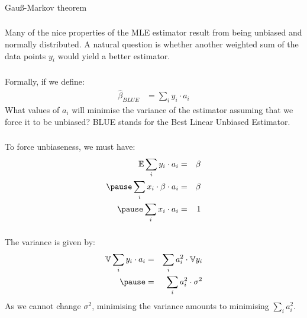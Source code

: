 \begin{frame}[fragile] \frametitle{}

\begin{flushright}
{\color{yaleblue}\sc\fontsize{1cm}{0cm}\selectfont Gauß-Markov theorem}
\end{flushright}

\end{frame}

\begin{frame}[fragile] \frametitle{}

Many of the nice properties of the MLE estimator result from being
unbiased and normally distributed. A natural question is whether
another weighted sum of the data points $y_i$ would yield a better
estimator.

\end{frame}

\begin{frame}[fragile] \frametitle{}

Formally, if we define:
\begin{align*}
\widehat{\beta}_{BLUE} &= \sum_i y_i \cdot a_i
\end{align*}
What values of $a_i$ will minimise the variance of the
estimator assuming that we force it to be unbiased? BLUE
stands for the Best Linear Unbiased Estimator.

\end{frame}

\begin{frame}[fragile] \frametitle{}

To force unbiaseness, we must have:
\begin{eqnarray*}
\mathbb{E} \sum_i y_i \cdot a_i &=& \beta \\ \pause
\sum_i x_i \cdot \beta \cdot a_i &=& \beta \\ \pause
\sum_i x_i \cdot a_i &=& 1 \\
\end{eqnarray*}

\end{frame}

\begin{frame}[fragile] \frametitle{}

The variance is given by:
\begin{eqnarray*}
\mathbb{V} \sum_i y_i \cdot a_i &=& \sum_i a_i^2 \cdot \mathbb{V} y_i \\ \pause
&=& \sum_i a_i^2 \cdot \sigma^2
\end{eqnarray*}
As we cannot change $\sigma^2$, minimising the variance
amounts to minimising $\sum_i a_i^2$.

\end{frame}

